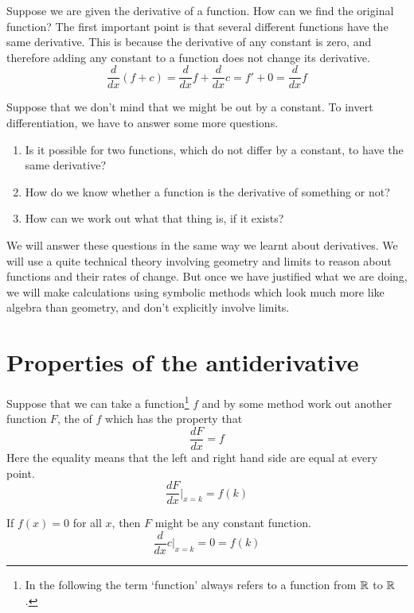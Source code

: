 Suppose we are given the derivative of a function. How can we find the original function? The first important point is that several different functions have the same derivative. This is because the derivative of any constant is zero, and therefore adding any constant to a function does not change its derivative. 
\[ \frac{d}{dx}(f + c) = \frac{d}{dx}f + \frac{d}{dx}c = f' + 0 = \frac{d}{dx}f \] 

Suppose that we don't mind that we might be out by a constant. To invert differentiation, we have to answer some more questions.
\begin{enumerate}
\item Is it possible for two functions, which do not differ by a constant, to have the same derivative?
\item How do we know whether a function is the derivative of something or not?
\item How can we work out what that thing is, if it exists?
\end{enumerate}

We will answer these questions in the same way we learnt about derivatives. We will use a quite technical theory involving geometry and limits to reason about functions and their rates of change. But once we have justified what we are doing, we will make calculations using symbolic methods which look much more like algebra than geometry, and don't explicitly involve limits.

\section{Properties of the antiderivative}
Suppose that we can take a function\footnote{In the following the term `function' always refers to a function from $\mathbb{R}$ to $\mathbb{R}$.} $f$ and by some method work out another function $F$, the  of $f$ which has the property that
\[ \frac{dF}{dx} = f \]
Here the equality means that the left and right hand side are equal at every point.
\[ \frac{dF}{dx} |_{x=k} = f(k) \]

If $f(x) = 0$ for all $x$, then $F$ might be any constant function. 
\[ \frac{d}{dx}c |_{x=k} = 0 = f(k) \]


